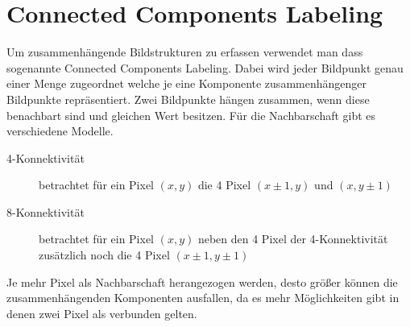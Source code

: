 \section*{Connected Components Labeling}

Um zusammenhängende Bildstrukturen zu erfassen verwendet man dass sogenannte
Connected Components Labeling. Dabei wird jeder Bildpunkt genau einer Menge
zugeordnet welche je eine Komponente zusammenhängenger Bildpunkte repräsentiert.
Zwei Bildpunkte hängen zusammen, wenn diese benachbart sind und gleichen Wert
besitzen. Für die Nachbarschaft gibt es verschiedene Modelle.

\begin{description}
  \item[4-Konnektivität]
    betrachtet für ein Pixel $(x,y)$ die 4 Pixel $(x\pm1,y)$ und $(x,y\pm1)$
  \item[8-Konnektivität]
    betrachtet für ein Pixel $(x,y)$ neben den 4 Pixel der 4-Konnektivität
    zusätzlich noch die 4 Pixel $(x\pm1,y\pm1)$
\end{description}
Je mehr Pixel als Nachbarschaft herangezogen werden, desto größer können die
zusammenhängenden Komponenten ausfallen, da es mehr Möglichkeiten gibt in denen
zwei Pixel als verbunden gelten.

